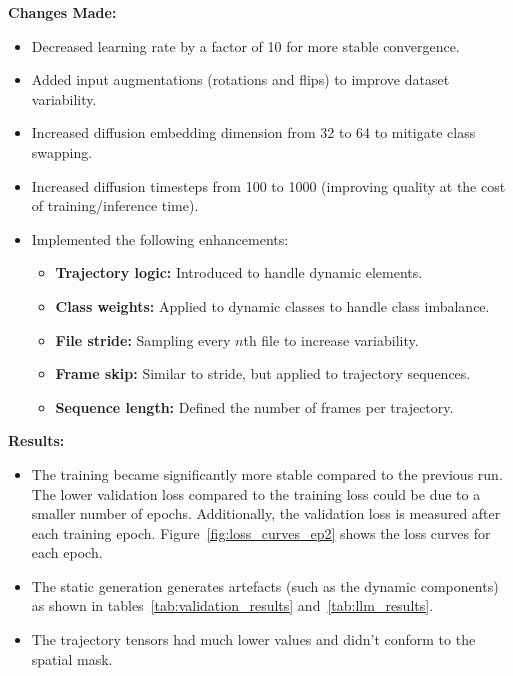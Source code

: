 \documentclass{article}
\begin{document}
\textbf{Changes Made:}
\begin{itemize}
    \item Decreased learning rate by a factor of 10 for more stable convergence.
    \item Added input augmentations (rotations and flips) to improve dataset variability.
    \item Increased diffusion embedding dimension from 32 to 64 to mitigate class swapping.
    \item Increased diffusion timesteps from 100 to 1000 (improving quality at the cost of training/inference time).
    \item Implemented the following enhancements:
    \begin{itemize}
        \item \textbf{Trajectory logic:} Introduced to handle dynamic elements.
        \item \textbf{Class weights:} Applied to dynamic classes to handle class imbalance.
        \item \textbf{File stride:} Sampling every $n$th file to increase variability.
        \item \textbf{Frame skip:} Similar to stride, but applied to trajectory sequences.
        \item \textbf{Sequence length:} Defined the number of frames per trajectory.
    \end{itemize}
\end{itemize}

\textbf{Results:}
\begin{itemize}
    \item The training became significantly more stable compared to the previous run. The lower validation loss compared to the training loss could be due to a smaller number of epochs. Additionally, the validation loss is measured after each training epoch.  Figure~\ref{fig:loss_curves_ep2} shows the loss curves for each epoch.
    \item The static generation generates artefacts (such as the dynamic components) as shown in tables~\ref{tab:validation_results} and~\ref{tab:llm_results}.
    \item The trajectory tensors had much lower values and didn't conform to the spatial mask.
\end{itemize}
\end{document}
